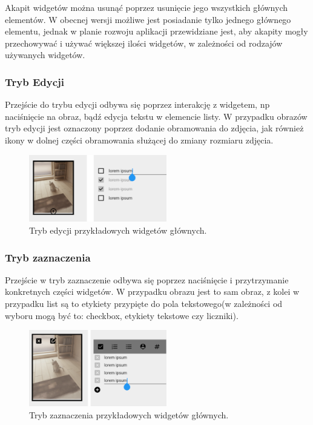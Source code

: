 Akapit widgetów można usunąć poprzez usunięcie jego wszystkich głównych elementów. W obecnej wersji możliwe jest posiadanie tylko jednego głównego elementu, jednak w planie rozwoju aplikacji przewidziane jest, aby akapity mogły przechowywać i używać większej ilości widgetów, w zależności od rodzajów używanych widgetów.

\subsubsection{Tryb Edycji}

Przejście do trybu edycji odbywa się poprzez interakcję z widgetem, np naciśnięcie na obraz, bądź edycja tekstu w elemencie listy.
W przypadku obrazów tryb edycji jest oznaczony poprzez dodanie obramowania do zdjęcia, jak również ikony w dolnej części obramowania służącej do zmiany rozmiaru zdjęcia.

\begin{figure}[ht]
    \centering
    \includegraphics[width=6cm]{images/tryb_edycji.png}
    \caption{Tryb edycji przykładowych widgetów głównych.}
    \vspace{3mm}
\end{figure}

\subsubsection{Tryb zaznaczenia}

Przejście w tryb zaznaczenie odbywa się poprzez naciśnięcie i przytrzymanie konkretnych części widgetów. W przypadku obrazu jest to sam obraz, z kolei w przypadku list są to etykiety przypięte do pola tekstowego(w zależności od wyboru mogą być to: checkbox, etykiety tekstowe czy liczniki).

\begin{figure}[ht]
    \centering
    \includegraphics[width=6cm]{images/tryb_zaznaczenia.png}
    \caption{Tryb zaznaczenia przykładowych widgetów głównych.}
    \vspace{3mm}
\end{figure}


